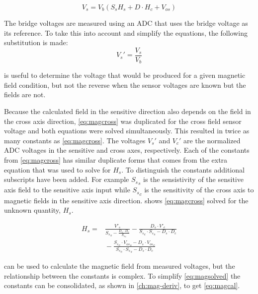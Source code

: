 \begin{equation}
    V_s = V_b \left(S_s H_s + D \cdot H_c + V_{os} \right)
    \label{eq:magcross}
\end{equation}
 
The bridge voltages are measured using an \ac{ADC} that uses the bridge voltage as its reference. To take this into account and simplify the equations, the following substitution is made:
\begin{equation}
    V_s'=\frac{V_s}{V_b}
    \label{eq:adcsub}
\end{equation}

 is useful to determine the voltage that would be produced for a given magnetic field condition, but not the reverse when the sensor voltages are known but the fields are not.

Because the calculated field in the sensitive direction also depends on the field in the cross axis direction, \cref{eq:magcross} was duplicated for the cross field sensor voltage and both equations were solved simultaneously. This resulted in twice as many constants as \cref{eq:magcross}. The voltages $V_s'$ and $V_c'$ are the normalized \ac{ADC} voltages in the sensitive and cross axes, respectively. Each of the constants from \cref{eq:magcross} has similar duplicate forms that comes from the extra equation that was used to solve for $H_s$. To distinguish the constants additional subscripts have been added. For example ${S_s}_s$ is the sensistivity of the sensitive axis field to the sensitive axis input while ${S_s}_c$ is the sensitivity of the cross axis to magnetic fields in the sensitive axis direction.  shows \cref{eq:magcross} solved for the unknown quantity, $H_s$.

\begin{equation}
    \begin{split}
    H_s = & \frac{V'_s }{{S_s}_s - \frac{D_s \cdot D_c}{{S_s}_c}} - \frac{D_s \cdot  V'_c }{{S_s}_c \cdot {S_s}_s - D_s \cdot D_c}\\
    & {}- \frac{{S_s}_c \cdot {V_{os}}_s  -D_s \cdot {V_{os}}_c}{{S_s}_c \cdot {S_s}_s - D_s \cdot D_c}
    \end{split}
    \label{eq:magsolved} 
\end{equation}

 can be used to calculate the magnetic field from measured voltages, but the relationship between the constants is complex. To simplify \cref{eq:magsolved} the constants can be consolidated, as shown in \cref{ch:mag-deriv}, to get \cref{eq:magcal}.

